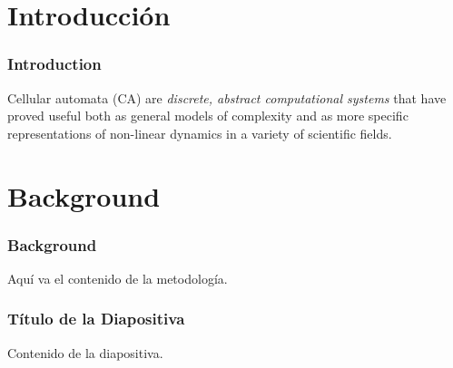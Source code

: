 \documentclass{beamer}
\begin{document}
\section{Introducción}
\begin{frame}
    \frametitle{Introduction}
    Cellular automata (CA) are \textit{discrete, abstract computational systems} that have proved useful both as general models of complexity and as more specific representations of non-linear dynamics in a variety of scientific fields.
\end{frame}

\section{Background}
\begin{frame}
    \frametitle{Background}
    Aquí va el contenido de la metodología.
\end{frame}

\begin{frame}
    \frametitle{Título de la Diapositiva}
    Contenido de la diapositiva.
\end{frame}
\end{document}
